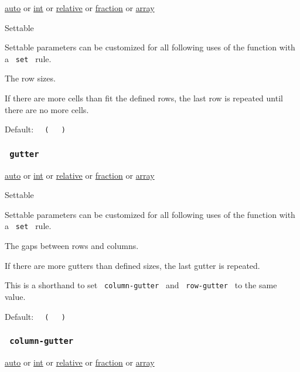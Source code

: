 \href{/docs/reference/foundations/auto/}{auto} {or}
\href{/docs/reference/foundations/int/}{int} {or}
\href{/docs/reference/layout/relative/}{relative} {or}
\href{/docs/reference/layout/fraction/}{fraction} {or}
\href{/docs/reference/foundations/array/}{array}

{{ Settable }}

\label{parameters-rows-settable-tooltip}
Settable parameters can be customized for all following uses of the
function with a \texttt{\ set\ } rule.

The row sizes.

If there are more cells than fit the defined rows, the last row is
repeated until there are no more cells.

Default:
\texttt{\ }{\texttt{\ (\ }}\texttt{\ }{\texttt{\ )\ }}\texttt{\ }

\subsubsection{\texorpdfstring{\texttt{\ gutter\ }}{ gutter }}\label{parameters-gutter}

\href{/docs/reference/foundations/auto/}{auto} {or}
\href{/docs/reference/foundations/int/}{int} {or}
\href{/docs/reference/layout/relative/}{relative} {or}
\href{/docs/reference/layout/fraction/}{fraction} {or}
\href{/docs/reference/foundations/array/}{array}

{{ Settable }}

\label{parameters-gutter-settable-tooltip}
Settable parameters can be customized for all following uses of the
function with a \texttt{\ set\ } rule.

The gaps between rows and columns.

If there are more gutters than defined sizes, the last gutter is
repeated.

This is a shorthand to set \texttt{\ column-gutter\ } and
\texttt{\ row-gutter\ } to the same value.

Default:
\texttt{\ }{\texttt{\ (\ }}\texttt{\ }{\texttt{\ )\ }}\texttt{\ }

\subsubsection{\texorpdfstring{\texttt{\ column-gutter\ }}{ column-gutter }}\label{parameters-column-gutter}

\href{/docs/reference/foundations/auto/}{auto} {or}
\href{/docs/reference/foundations/int/}{int} {or}
\href{/docs/reference/layout/relative/}{relative} {or}
\href{/docs/reference/layout/fraction/}{fraction} {or}
\href{/docs/reference/foundations/array/}{array}

